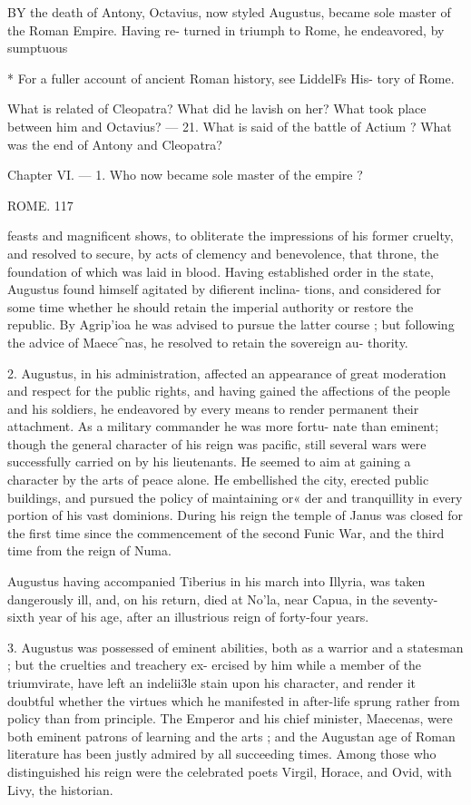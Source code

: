\documentclass[openany,a4paper]{memoir}
\begin{document}
BY the death of Antony, Octavius, now styled Augustus, 
became sole master of the Roman Empire. Having re- 
turned in triumph to Rome, he endeavored, by sumptuous 

* For a fuller account of ancient Roman history, see LiddelFs His- 
tory of Rome. 

What is related of Cleopatra? What did he lavish on her? What 
took place between him and Octavius? — 21. What is said of the battle 
of Actium ? What was the end of Antony and Cleopatra? 

Chapter VI. — 1. Who now became sole master of the empire ? 



ROME. 117 

feasts and magnificent shows, to obliterate the impressions 
of his former cruelty, and resolved to secure, by acts of 
clemency and benevolence, that throne, the foundation of 
which was laid in blood. Having established order in the 
state, Augustus found himself agitated by difierent inclina- 
tions, and considered for some time whether he should retain 
the imperial authority or restore the republic. By Agrip'ioa 
he was advised to pursue the latter course ; but following the 
advice of Maece^nas, he resolved to retain the sovereign au- 
thority. 

2. Augustus, in his administration, affected an appearance 
of great moderation and respect for the public rights, and 
having gained the affections of the people and his soldiers, 
he endeavored by every means to render permanent their 
attachment. As a military commander he was more fortu- 
nate than eminent; though the general character of his reign 
was pacific, still several wars were successfully carried on by 
his lieutenants. He seemed to aim at gaining a character by 
the arts of peace alone. He embellished the city, erected 
public buildings, and pursued the policy of maintaining or« 
der and tranquillity in every portion of his vast dominions. 
During his reign the temple of Janus was closed for the first 
time since the commencement of the second Funic War, and 
the third time from the reign of Numa. 

Augustus having accompanied Tiberius in his march into 
Illyria, was taken dangerously ill, and, on his return, died at 
No'la, near Capua, in the seventy-sixth year of his age, after 
an illustrious reign of forty-four years. 

3. Augustus was possessed of eminent abilities, both as a 
warrior and a statesman ; but the cruelties and treachery ex- 
ercised by him while a member of the triumvirate, have left 
an indelii3le stain upon his character, and render it doubtful 
whether the virtues which he manifested in after-life sprung 
rather from policy than from principle. The Emperor and 
his chief minister, Maecenas, were both eminent patrons of 
learning and the arts ; and the Augustan age of Roman 
literature has been justly admired by all succeeding times. 
Among those who distinguished his reign were the celebrated 
poets Virgil, Horace, and Ovid, with Livy, the historian. 
\end{document}

